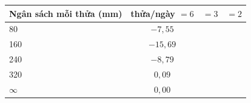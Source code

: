 
\begin{tabular}{@{}lccc@{}}
\toprule
Ngân sách mỗi thửa (mm) & thửa/ngày $=6$ & $=3$ & $=2$ \\
\midrule
80 & $-7{,}55$ \\
160 & $-15{,}69$ \\
240 & $-8{,}79$ \\
320 & $0{,}09$ \\
$\infty$ & $0{,}00$ \\
\bottomrule
\end{tabular}
